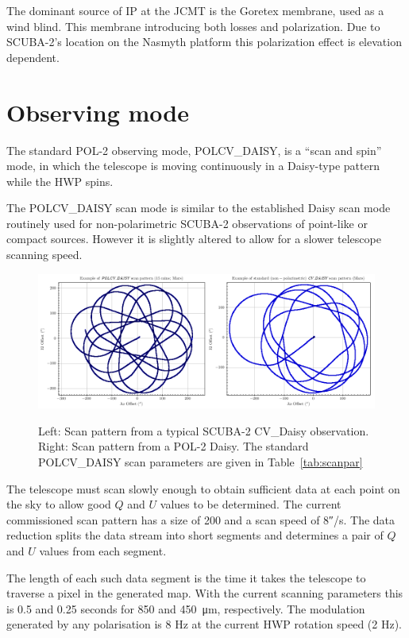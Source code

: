 The dominant source of IP at the JCMT is the Goretex membrane, used as a wind blind.
This membrane introducing both losses and polarization. Due to SCUBA-2's location
on the Nasmyth platform this polarization effect is elevation dependent.


\section{Observing mode}
\label{sec:mmodes}

The standard POL-2 observing mode, POLCV\_DAISY, is a “scan and spin” mode,
in which the telescope is moving continuously in a Daisy-type pattern while the
HWP spins.

The POLCV\_DAISY scan mode is similar to the established Daisy scan mode
routinely used for non-polarimetric SCUBA-2 observations of point-like or compact
sources. However it is slightly altered to allow for a slower telescope scanning
speed.


\begin{figure}[t!]
\begin{center}
\includegraphics[width=0.9\linewidth]{scan_pattern_daisy_comparison.png}
\label{fig:scancompsrison}
\caption [Scan Pattern Comparison]{Left: Scan pattern from a typical SCUBA-2 CV_Daisy
observation. Right: Scan pattern from a POL-2 Daisy. The standard POLCV\_DAISY scan
parameters are given in Table~\ref{tab:scanpar}
  \small
}
\end{center}
\end{figure}




The telescope must scan slowly enough to obtain sufficient data at each
point on the sky to allow good $Q$ and $U$ values to be determined. The current
commissioned scan pattern has a size of 200\arcs{} and a scan speed of
8\si{\arcsecond}/s. The data reduction splits the data stream into short
segments and determines a pair of $Q$ and $U$ values from each segment.

The length of each such data segment is the time it takes the telescope to traverse
a pixel in the generated map. With the current scanning parameters this is 0.5 and
0.25 seconds for 850 and \SI{450}{\micro\metre}, respectively. The modulation
generated by any polarisation is 8 Hz at the current HWP rotation speed
(2 Hz).


